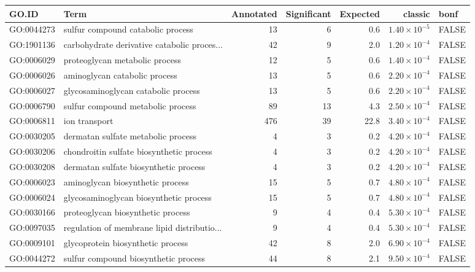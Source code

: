 \begin{table}[ht]
\centering
\begin{adjustbox}{max width=\textwidth}
\begin{tabular}{llrrrrl}
  \hline
GO.ID & Term & Annotated & Significant & Expected & classic & bonf \\ 
  \hline
GO:0044273 & sulfur compound catabolic process & 13 & 6 & 0.6 & $1.40 \times 10^{-5}$ & FALSE \\ 
  GO:1901136 & carbohydrate derivative catabolic proces... & 42 & 9 & 2.0 & $1.20 \times 10^{-4}$ & FALSE \\ 
  GO:0006029 & proteoglycan metabolic process & 12 & 5 & 0.6 & $1.40 \times 10^{-4}$ & FALSE \\ 
  GO:0006026 & aminoglycan catabolic process & 13 & 5 & 0.6 & $2.20 \times 10^{-4}$ & FALSE \\ 
  GO:0006027 & glycosaminoglycan catabolic process & 13 & 5 & 0.6 & $2.20 \times 10^{-4}$ & FALSE \\ 
  GO:0006790 & sulfur compound metabolic process & 89 & 13 & 4.3 & $2.50 \times 10^{-4}$ & FALSE \\ 
  GO:0006811 & ion transport & 476 & 39 & 22.8 & $3.40 \times 10^{-4}$ & FALSE \\ 
  GO:0030205 & dermatan sulfate metabolic process & 4 & 3 & 0.2 & $4.20 \times 10^{-4}$ & FALSE \\ 
  GO:0030206 & chondroitin sulfate biosynthetic process & 4 & 3 & 0.2 & $4.20 \times 10^{-4}$ & FALSE \\ 
  GO:0030208 & dermatan sulfate biosynthetic process & 4 & 3 & 0.2 & $4.20 \times 10^{-4}$ & FALSE \\ 
  GO:0006023 & aminoglycan biosynthetic process & 15 & 5 & 0.7 & $4.80 \times 10^{-4}$ & FALSE \\ 
  GO:0006024 & glycosaminoglycan biosynthetic process & 15 & 5 & 0.7 & $4.80 \times 10^{-4}$ & FALSE \\ 
  GO:0030166 & proteoglycan biosynthetic process & 9 & 4 & 0.4 & $5.30 \times 10^{-4}$ & FALSE \\ 
  GO:0097035 & regulation of membrane lipid distributio... & 9 & 4 & 0.4 & $5.30 \times 10^{-4}$ & FALSE \\ 
  GO:0009101 & glycoprotein biosynthetic process & 42 & 8 & 2.0 & $6.90 \times 10^{-4}$ & FALSE \\ 
  GO:0044272 & sulfur compound biosynthetic process & 44 & 8 & 2.1 & $9.50 \times 10^{-4}$ & FALSE \\ 

\end{tabular}
\end{adjustbox}
\end{table}
